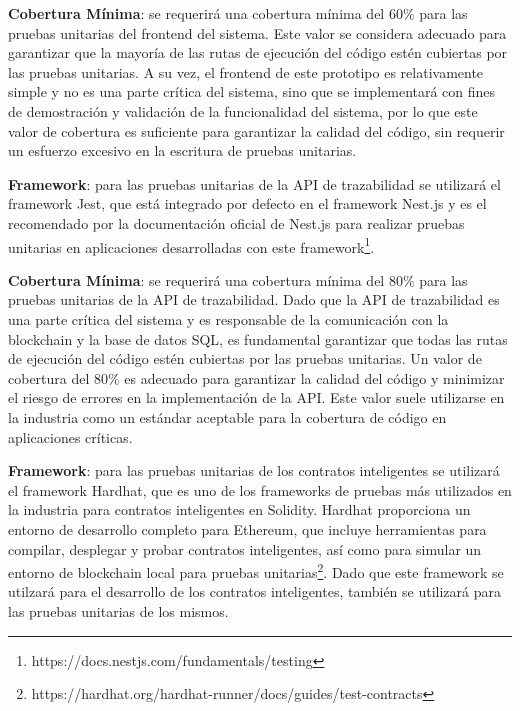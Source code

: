 \documentclass[main.tex]{subfiles}
\begin{document}
\textbf{Cobertura Mínima}: se requerirá una cobertura mínima del 60\% para las pruebas unitarias del frontend del sistema. Este valor se considera adecuado para garantizar que la mayoría de las rutas de ejecución del código estén cubiertas por las pruebas unitarias. A su vez, el frontend de este prototipo es relativamente simple y no es una parte crítica del sistema, sino que se implementará con fines de demostración y validación de la funcionalidad del sistema, por lo que este valor de cobertura es suficiente para garantizar la calidad del código, sin requerir un esfuerzo excesivo en la escritura de pruebas unitarias.


\textbf{Framework}: para las pruebas unitarias de la API de trazabilidad se utilizará el framework Jest, que está integrado por defecto en el framework Nest.js y es el recomendado por la documentación oficial de Nest.js para realizar pruebas unitarias en aplicaciones desarrolladas con este framework\footnote{https://docs.nestjs.com/fundamentals/testing}.

\textbf{Cobertura Mínima}: se requerirá una cobertura mínima del 80\% para las pruebas unitarias de la API de trazabilidad. Dado que la API de trazabilidad es una parte crítica del sistema y es responsable de la comunicación con la blockchain y la base de datos SQL, es fundamental garantizar que todas las rutas de ejecución del código estén cubiertas por las pruebas unitarias. Un valor de cobertura del 80\% es adecuado para garantizar la calidad del código y minimizar el riesgo de errores en la implementación de la API. Este valor suele utilizarse en la industria como un estándar aceptable para la cobertura de código en aplicaciones críticas.


\textbf{Framework}: para las pruebas unitarias de los contratos inteligentes se utilizará el framework Hardhat, que es uno de los frameworks de pruebas más utilizados en la industria para contratos inteligentes en Solidity. Hardhat proporciona un entorno de desarrollo completo para Ethereum, que incluye herramientas para compilar, desplegar y probar contratos inteligentes, así como para simular un entorno de blockchain local para pruebas unitarias\footnote{https://hardhat.org/hardhat-runner/docs/guides/test-contracts}. Dado que este framework se utilzará para el desarrollo de los contratos inteligentes, también se utilizará para las pruebas unitarias de los mismos.
\end{document}
